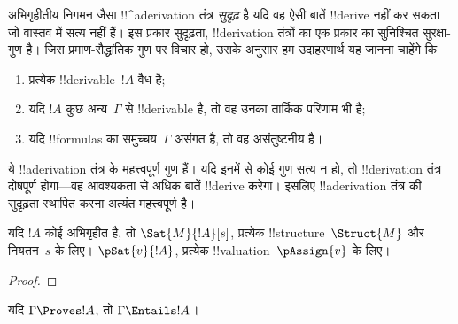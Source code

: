 \documentclass[../../../include/open-logic-section]{subfiles}
\begin{document}
      {}
      {}
      

\begin{explain}
अभिगृहीतीय निगमन जैसा !!^a{derivation} तंत्र \emph{सुदृढ़} है यदि वह ऐसी
बातें !!{derive} नहीं कर सकता जो वास्तव में सत्य नहीं हैं। इस प्रकार
सुदृढ़ता, !!{derivation} तंत्रों का एक प्रकार का सुनिश्चित सुरक्षा-गुण है।
जिस प्रमाण-सैद्धांतिक गुण पर विचार हो, उसके अनुसार हम उदाहरणार्थ यह जानना
चाहेंगे कि
\begin{enumerate}
\item प्रत्येक !!{derivable}~$!A$ वैध है;
\item यदि $!A$ कुछ अन्य~$\Gamma$ से !!{derivable} है, तो वह उनका तार्किक
  परिणाम भी है;
\item यदि !!{formula}s का समुच्चय~$\Gamma$ असंगत है, तो वह असंतुष्टनीय है।
\end{enumerate}
ये !!a{derivation} तंत्र के महत्त्वपूर्ण गुण हैं। यदि इनमें से कोई गुण सत्य
न हो, तो !!{derivation} तंत्र दोषपूर्ण होगा---वह आवश्यकता से अधिक बातें
!!{derive} करेगा। इसलिए !!a{derivation} तंत्र की सुदृढ़ता स्थापित करना अत्यंत
महत्त्वपूर्ण है।
\end{explain}

\begin{prop}
  यदि $!A$ कोई अभिगृहीत है, तो
    {$\Sat{M}{!A}[s]$, प्रत्येक !!{structure}~$\Struct{M}$ और नियतन~$s$ के लिए।}
    {$\pSat{v}{!A}$, प्रत्येक !!{valuation}~$\pAssign{v}$ के लिए।}
\end{prop}

\begin{proof}
\end{proof}

\begin{thm}[सुदृढ़ता]
यदि $\Gamma \Proves !A$, तो $\Gamma \Entails !A$।
\end{thm}
\end{document}
